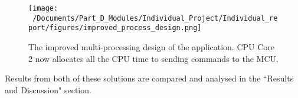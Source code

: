 \begin{figure}[htbp] %
	\centering
	\texttt{[image: ~/Documents/Part\_D\_Modules/Individual\_Project/Individual\_report/figures/improved\_process\_design.png]} %
	\caption{The improved multi-processing design of the application. CPU Core 2 now allocates all the CPU time to sending commands to the MCU.}
	\label{fig:improved_application_design} %
\end{figure}


Results from both of these solutions are compared and analysed in the ``Results and Discussion" section. 